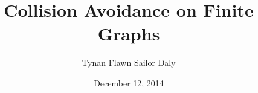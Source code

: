 \documentclass[12pt,oneside]{amsbook}
\numberwithin{equation}{chapter}
\numberwithin{figure}{chapter}
\numberwithin{section}{chapter}
\begin{document}
\frontmatter %
\title[]{Collision Avoidance on Finite Graphs}
\author{Tynan Flawn Sailor Daly}
\address{Department of Mathematics\\Bates College\\Lewiston, ME 04240}
\date{December 12, 2014}
\maketitle

\newpage
\thispagestyle{empty}

\setcounter{page}{2}

\tableofcontents
 \listoffigures

\mainmatter





\backmatter

\end{document}
